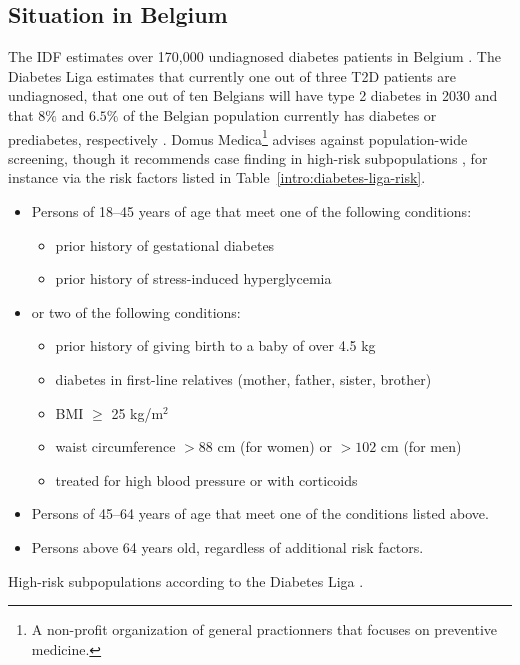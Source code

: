 %
%


\subsection{Situation in Belgium} \label{intro:screening-belgium}
The IDF estimates over 170,000 undiagnosed diabetes patients in Belgium \citep{IDFatlas}. The Diabetes Liga estimates that currently one out of three T2D patients are undiagnosed, that one out of ten Belgians will have type 2 diabetes in 2030 and that $8\%$ and $6.5\%$ of the Belgian population currently has diabetes or prediabetes, respectively \citep{diabetesliga}. Domus Medica\footnote{A non-profit organization of general practionners that focuses on preventive medicine.} advises against population-wide screening, though it recommends case finding in high-risk subpopulations \citep{wens2005aanbeveling}, for instance via the risk factors listed in Table~\ref{intro:diabetes-liga-risk}.
\begin{table}[!h]
\colorbox{gray!20!white}{\parbox{\textwidth}{
\begin{itemize}
\item Persons of 18--45 years of age that meet one of the following conditions:
\begin{itemize}
\item prior history of gestational diabetes
\item prior history of stress-induced hyperglycemia
\end{itemize}
\item or two of the following conditions:
\begin{itemize}
\item prior history of giving birth to a baby of over 4.5 kg
\item diabetes in first-line relatives (mother, father, sister, brother)
\item BMI $\geq$ 25 kg/m$^2$
\item waist circumference $>88$ cm (for women) or $>102$ cm (for men)
\item treated for high blood pressure or with corticoids
\end{itemize}
\item Persons of 45--64 years of age that meet one of the conditions listed above.
\item Persons above 64 years old, regardless of additional risk factors.
\end{itemize}
}}
\caption{High-risk subpopulations according to the Diabetes Liga \citep{diabetesliga}.} \label{intro:diabetes-liga-risk}
\end{table}

